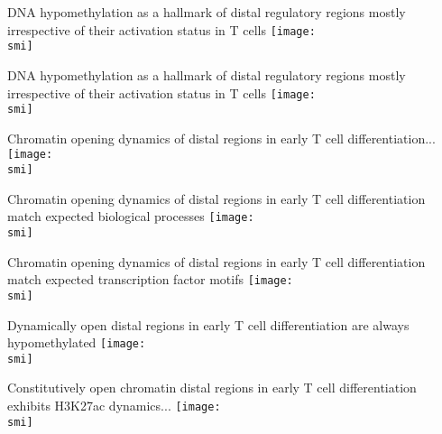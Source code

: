 \documentclass[10pt]{beamer}
\def\smi{out/ln/updir/mw-gcthesis-oral/library.bib}
\begin{document}
    \begin{frame}{DNA hypomethylation as a hallmark of distal regulatory regions mostly irrespective of their activation status in T cells}
      \def\smi{out/ln/updir/mw-gcthesis-oral/ink/chromatin-states/genome-view/enhancers/2.pdf}
      \texttt{[image: \\smi]}
    \end{frame}
    \begin{frame}{DNA hypomethylation as a hallmark of distal regulatory regions mostly irrespective of their activation status in T cells}
      \def\smi{out/ln/updir/mw-gcthesis-oral/ink/chromatin-states/genome-view/enhancers/3.pdf}
      \texttt{[image: \\smi]}
    \end{frame}
    \begin{frame}{Chromatin opening dynamics of distal regions in early T cell differentiation...}
      \def\smi{out/ln/updir/mw-gcthesis-oral/ink/atac-clusters/atac.pdf}
      \texttt{[image: \\smi]}
    \end{frame}
    \begin{frame}{Chromatin opening dynamics of distal regions in early T cell differentiation match expected biological processes} 
      \def\smi{out/ln/updir/mw-gcthesis-oral/ink/atac-clusters/atac-gobp.pdf}
      \texttt{[image: \\smi]}
    \end{frame}
    \begin{frame}{Chromatin opening dynamics of distal regions in early T cell differentiation match expected transcription factor motifs} 
      \def\smi{out/ln/updir/mw-gcthesis-oral/ink/atac-clusters/atac-motifs.pdf}
      \texttt{[image: \\smi]}
    \end{frame}
    \begin{frame}{Dynamically open distal regions in early T cell differentiation are always hypomethylated}
      \def\smi{out/ln/updir/mw-gcthesis-oral/ink/atac-clusters/atac-wgbs.pdf}
      \texttt{[image: \\smi]}
    \end{frame}
    \begin{frame}{Constitutively open chromatin distal regions in early T cell differentiation exhibits H3K27ac dynamics...}
      \def\smi{out/ln/updir/mw-gcthesis-oral/ink/atac-clusters/atac-wgbs-h3k27ac.pdf}
      \texttt{[image: \\smi]}
    \end{frame}
\end{document}
